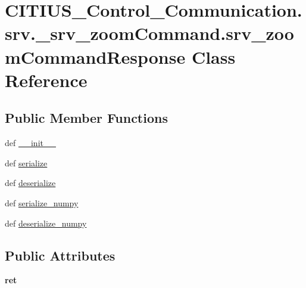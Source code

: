 \hypertarget{class_c_i_t_i_u_s___control___communication_1_1srv_1_1__srv__zoom_command_1_1srv__zoom_command_response}{\section{\-C\-I\-T\-I\-U\-S\-\_\-\-Control\-\_\-\-Communication.\-srv.\-\_\-srv\-\_\-zoom\-Command.\-srv\-\_\-zoom\-Command\-Response \-Class \-Reference}
\label{class_c_i_t_i_u_s___control___communication_1_1srv_1_1__srv__zoom_command_1_1srv__zoom_command_response}
}
\subsection*{\-Public \-Member \-Functions}
\begin{DoxyCompactItemize}
\item 
def \hyperlink{class_c_i_t_i_u_s___control___communication_1_1srv_1_1__srv__zoom_command_1_1srv__zoom_command_response_af268dd3d37d7b8227bc0ab1ecb8b6a2c}{\-\_\-\-\_\-init\-\_\-\-\_\-}
\item 
def \hyperlink{class_c_i_t_i_u_s___control___communication_1_1srv_1_1__srv__zoom_command_1_1srv__zoom_command_response_a110719fab4af10fd1e22d4a56384e124}{serialize}
\item 
def \hyperlink{class_c_i_t_i_u_s___control___communication_1_1srv_1_1__srv__zoom_command_1_1srv__zoom_command_response_a9e92bab3fe3e335ca5a4480cd1270b5f}{deserialize}
\item 
def \hyperlink{class_c_i_t_i_u_s___control___communication_1_1srv_1_1__srv__zoom_command_1_1srv__zoom_command_response_a66dffb5cb7f322778238ca38e16e3ff9}{serialize\-\_\-numpy}
\item 
def \hyperlink{class_c_i_t_i_u_s___control___communication_1_1srv_1_1__srv__zoom_command_1_1srv__zoom_command_response_ad6555a126af7c5424476920a7a3a93b6}{deserialize\-\_\-numpy}
\end{DoxyCompactItemize}
\subsection*{\-Public \-Attributes}
\begin{DoxyCompactItemize}
\item 
\hypertarget{class_c_i_t_i_u_s___control___communication_1_1srv_1_1__srv__zoom_command_1_1srv__zoom_command_response_a8cc320c0464e787da15ac94ce711a211}{{\bfseries ret}}\label{class_c_i_t_i_u_s___control___communication_1_1srv_1_1__srv__zoom_command_1_1srv__zoom_command_response_a8cc320c0464e787da15ac94ce711a211}

\end{DoxyCompactItemize}
